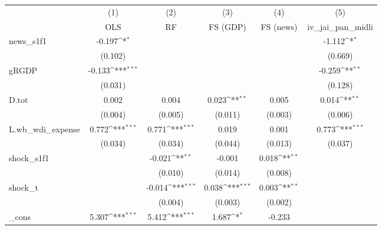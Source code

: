 {
\def\sym#1{\ifmmode^{#1}\else\(^{#1}\)\fi}
\begin{tabular}{l*{5}{c}}
\toprule
            &\multicolumn{1}{c}{(1)}&\multicolumn{1}{c}{(2)}&\multicolumn{1}{c}{(3)}&\multicolumn{1}{c}{(4)}&\multicolumn{1}{c}{(5)}\\
            &\multicolumn{1}{c}{OLS}&\multicolumn{1}{c}{RF}&\multicolumn{1}{c}{FS (GDP)}&\multicolumn{1}{c}{FS (news)}&\multicolumn{1}{c}{iv\_jai\_pan\_midli}\\
\midrule
news\_s1f1   &      -0.197\sym{*}  &                     &                     &                     &      -1.112\sym{*}  \\
            &     (0.102)         &                     &                     &                     &     (0.669)         \\
\addlinespace
gRGDP       &      -0.133\sym{***}&                     &                     &                     &      -0.259\sym{**} \\
            &     (0.031)         &                     &                     &                     &     (0.128)         \\
\addlinespace
D.tot       &       0.002         &       0.004         &       0.023\sym{**} &       0.005         &       0.014\sym{**} \\
            &     (0.004)         &     (0.005)         &     (0.011)         &     (0.003)         &     (0.006)         \\
\addlinespace
L.wb\_wdi\_expense&       0.772\sym{***}&       0.771\sym{***}&       0.019         &       0.001         &       0.773\sym{***}\\
            &     (0.034)         &     (0.034)         &     (0.044)         &     (0.013)         &     (0.037)         \\
\addlinespace
shock\_s1f1  &                     &      -0.021\sym{**} &      -0.001         &       0.018\sym{**} &                     \\
            &                     &     (0.010)         &     (0.014)         &     (0.008)         &                     \\
\addlinespace
shock\_t     &                     &      -0.014\sym{***}&       0.038\sym{***}&       0.003\sym{**} &                     \\
            &                     &     (0.004)         &     (0.003)         &     (0.002)         &                     \\
\addlinespace
\_cons      &       5.307\sym{***}&       5.412\sym{***}&       1.687\sym{*}  &      -0.233         &                     \\

\end{tabular}}
